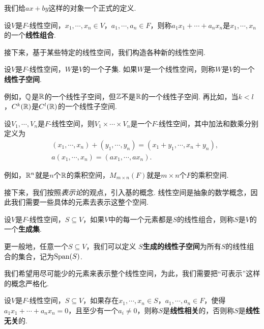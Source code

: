 我们给$ax+by$这样的对象一个正式的定义. 

\begin{definition}[线性组合]
设$V$是$F$-线性空间，$x_1,\cdots,x_n\in V$，$a_1,\cdots,a_n\in F$，则称$a_1x_1+\cdots+a_nx_n$是$x_1,\cdots,x_n$的一个\textbf{线性组合}. 
\end{definition}

接下来，基于某些特定的线性空间，我们构造各种新的线性空间. 

\begin{definition}[线性子空间]
设$V$是$F$-线性空间，$W$是$V$的一个子集. 如果$W$是一个线性空间，则称$W$是$V$的一个\textbf{线性子空间}. 
\end{definition}

例如，$\mathbb{Q}$是$\mathbb{R}$的一个线性子空间，但$\mathbb{Z}$不是$\mathbb{R}$的一个线性子空间. 再比如，当$k<l$，$C^k(\mathbb{R})$是$C^l(\mathbb{R})$的一个线性子空间. 

\begin{definition}[乘积空间]
设$V_1,\cdots,V_n$是$F$-线性空间，则$V_1\times\cdots\times V_n$是一个$F$-线性空间，其中加法和数乘分别定义为
\begin{align*}
    &(x_1,\cdots,x_n)+(y_1,\cdots,y_n)=(x_1+y_1,\cdots,x_n+y_n),\\
    &a(x_1,\cdots,x_n)=(ax_1,\cdots,ax_n).
\end{align*}
\end{definition}

例如，$\mathbb{R}^n$就是$n$个$\mathbb{R}$的乘积空间，$M_{m\times n}(F)$就是$m\times n$个$F$的乘积空间. 

接下来，我们按照\emph{表示论}的观点，引入基的概念. 线性空间是抽象的数学概念，因此我们需要一些具体的元素去表示这整个空间. 

\begin{definition}[生成集]
设$V$是$F$-线性空间，$S\subseteq V$，如果$V$中的每一个元素都是$S$的线性组合，则称$S$是$V$的一个\textbf{生成集}. 

更一般地，任意一个$S\subseteq V$，我们可以定义 \textbf{$S$生成的线性子空间}为所有$S$的线性组合的集合，记为$\operatorname*{Span}(S)$. 
\end{definition}

我们希望用尽可能少的元素来表示整个线性空间，为此，我们需要把“可表示”这样的概念严格化. 

\begin{definition}[线性相关]
设$V$是$F$-线性空间，$S\subseteq V$，如果存在$x_1,\cdots,x_n\in S$，$a_1,\cdots,a_n\in F$，使得$a_1x_1+\cdots+a_nx_n=0$，且至少有一个$a_i\neq 0$，则称$S$是\textbf{线性相关}的，否则称$S$是\textbf{线性无关}的. 
\end{definition}

